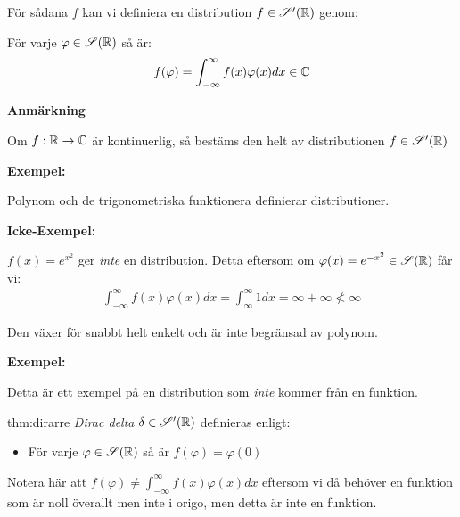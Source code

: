 \par\bigskip
\noindent För sådana $f$ kan vi definiera en distribution $f\in\mathscr{S}^{\prime}(\mathbb{R})$ genom:\par
För varje $\varphi\in\mathscr{S}(\mathbb{R})$ så är:
\begin{equation*}
  \begin{gathered}
    f(\varphi) = \int_{-\infty}^{\infty}f(x)\varphi(x)dx\in\mathbb{C}
  \end{gathered}
\end{equation*}
\par\bigskip
\noindent\textbf{Anmärkning}\par
\noindent Om $f:\mathbb{R}\to\mathbb{C}$ är kontinuerlig, så bestäms den helt av distributionen $f\in\mathscr{S}^{\prime}(\mathbb{R})$ 
\par\bigskip
\noindent\textbf{Exempel:}\par
\noindent Polynom och de trigonometriska funktionera definierar distributioner.
\par\bigskip
\noindent\textbf{Icke-Exempel:}\par
\noindent $f(x) = e^{x^2}$ ger \textit{inte} en distribution. Detta eftersom om $\varphi(x) = e^{-x^2}\in\mathscr{S}(\mathbb{R})$ får vi:
\begin{equation*}
  \begin{gathered}
    \int_{-\infty}^{\infty}f(x)\varphi(x)dx = \int_{\infty}^{\infty}1dx = \infty+\infty \not<\infty
  \end{gathered}
\end{equation*}
\par\bigskip
\noindent Den växer för snabbt helt enkelt och är inte begränsad av polynom.
\par\bigskip
\noindent\textbf{Exempel:}\par
\noindent Detta är ett exempel på en distribution som \textit{inte} kommer från en funktion.
\par\bigskip
\begin{theo}{thm:dirarre}
  \textit{Dirac delta} $\delta\in\mathscr{S}^{\prime}(\mathbb{R})$ definieras enligt:\par
  \begin{itemize}
    \item För varje $\varphi\in\mathscr{S}(\mathbb{R})$ så är $f(\varphi) = \varphi(0)$
  \end{itemize}
  \par\bigskip
  \noindent Notera här att $f(\varphi)\neq\int_{-\infty}^{\infty}f(x)\varphi(x)dx$ eftersom vi då behöver en funktion som är noll överallt men inte i origo, men detta är inte en funktion.
\end{theo}
